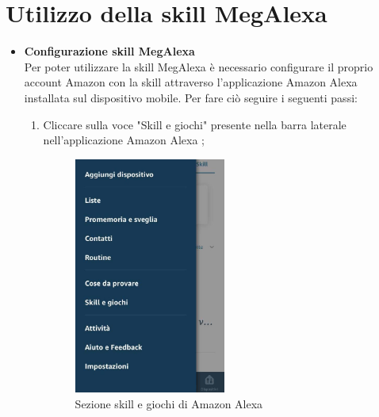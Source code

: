 \section{Utilizzo della skill MegAlexa}
\label{Utilizzo skill}
\begin{itemize}
\item  \textbf{Configurazione skill MegAlexa}\\
\label{Configurazione MegAlexa}
Per poter utilizzare la skill MegAlexa è necessario configurare il proprio account Amazon con la skill  attraverso l'applicazione Amazon Alexa installata sul dispositivo mobile. Per fare ciò seguire i seguenti passi:
\begin{enumerate}
	\item  Cliccare sulla voce "Skill e giochi"  presente nella barra laterale nell'applicazione Amazon Alexa ;
	
	\begin{figure}[!ht]
		\centering
		\includegraphics[width=0.5\textwidth]{images/SkillGiochi.png}
		\caption{Sezione skill e giochi di Amazon Alexa}
	\end{figure}
\newpage
	

\end{enumerate}
\end{itemize}
